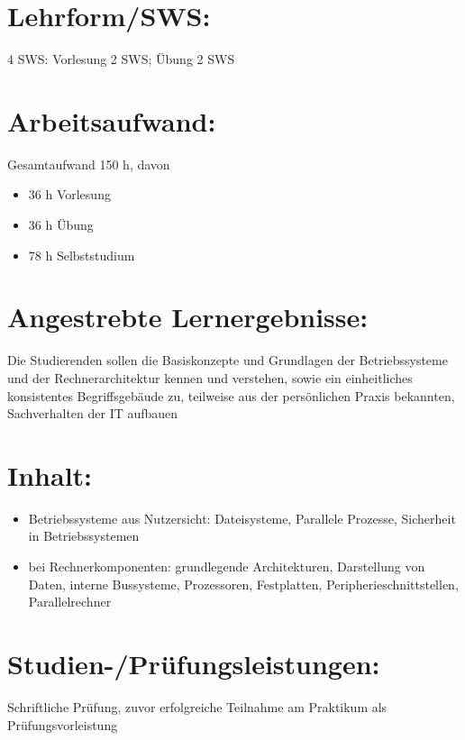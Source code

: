 \section*{Lehrform/SWS:}\label{lehrformsws-8}

4 SWS: Vorlesung 2 SWS; Übung 2 SWS

\section*{Arbeitsaufwand:}\label{arbeitsaufwand-8}

Gesamtaufwand 150 h, davon

\begin{itemize}
\item
  36 h Vorlesung
\item
  36 h Übung
\item
  78 h Selbststudium
\end{itemize}

\section*{Angestrebte
Lernergebnisse:}\label{angestrebte-lernergebnisse-8}

Die Studierenden sollen die Basiskonzepte und Grundlagen der
Betriebssysteme und der Rechnerarchitektur kennen und verstehen, sowie
ein einheitliches konsistentes Begriffsgebäude zu, teilweise aus der
persönlichen Praxis bekannten, Sachverhalten der IT aufbauen

\section*{Inhalt:}\label{inhalt-8}

\begin{itemize}
\item
  Betriebssysteme aus Nutzersicht: Dateisysteme, Parallele Prozesse,
  Sicherheit in Betriebssystemen
\item
  bei Rechnerkomponenten: grundlegende Architekturen, Darstellung von
  Daten, interne Bussysteme, Prozessoren, Festplatten,
  Peripherieschnittstellen, Parallelrechner
\end{itemize}

\section*{Studien-/Prüfungsleistungen:}\label{studien-pruxfcfungsleistungen-7}

Schriftliche Prüfung, zuvor erfolgreiche Teilnahme am Praktikum als
Prüfungsvorleistung


